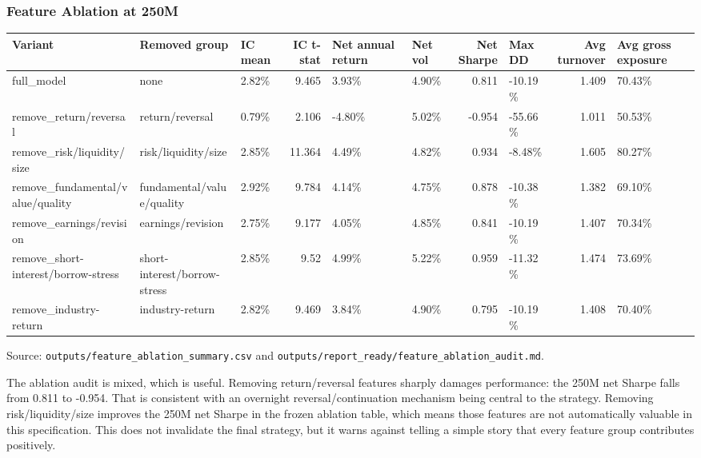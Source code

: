 \documentclass[
]{article}
\begin{document}
\hypertarget{feature-ablation-at-250m}{%
\subsubsection{Feature Ablation at
250M}\label{feature-ablation-at-250m}}

\begin{longtable}[]{@{}lllrllrlrl@{}}
\toprule
Variant & Removed group & IC mean & IC t-stat & Net annual return & Net
vol & Net Sharpe & Max DD & Avg turnover & Avg gross exposure \\
\midrule
\endhead
full\_model & none & 2.82\% & 9.465 & 3.93\% & 4.90\% & 0.811 & -10.19\%
& 1.409 & 70.43\% \\
remove\_return/reversal & return/reversal & 0.79\% & 2.106 & -4.80\% &
5.02\% & -0.954 & -55.66\% & 1.011 & 50.53\% \\
remove\_risk/liquidity/size & risk/liquidity/size & 2.85\% & 11.364 &
4.49\% & 4.82\% & 0.934 & -8.48\% & 1.605 & 80.27\% \\
remove\_fundamental/value/quality & fundamental/value/quality & 2.92\% &
9.784 & 4.14\% & 4.75\% & 0.878 & -10.38\% & 1.382 & 69.10\% \\
remove\_earnings/revision & earnings/revision & 2.75\% & 9.177 & 4.05\%
& 4.85\% & 0.841 & -10.19\% & 1.407 & 70.34\% \\
remove\_short-interest/borrow-stress & short-interest/borrow-stress &
2.85\% & 9.52 & 4.99\% & 5.22\% & 0.959 & -11.32\% & 1.474 & 73.69\% \\
remove\_industry-return & industry-return & 2.82\% & 9.469 & 3.84\% &
4.90\% & 0.795 & -10.19\% & 1.408 & 70.40\% \\
\bottomrule
\end{longtable}

Source: \texttt{outputs/feature\_ablation\_summary.csv} and
\texttt{outputs/report\_ready/feature\_ablation\_audit.md}.

The ablation audit is mixed, which is useful. Removing return/reversal
features sharply damages performance: the 250M net Sharpe falls from
0.811 to -0.954. That is consistent with an overnight
reversal/continuation mechanism being central to the strategy. Removing
risk/liquidity/size improves the 250M net Sharpe in the frozen ablation
table, which means those features are not automatically valuable in this
specification. This does not invalidate the final strategy, but it warns
against telling a simple story that every feature group contributes
positively.
\end{document}
